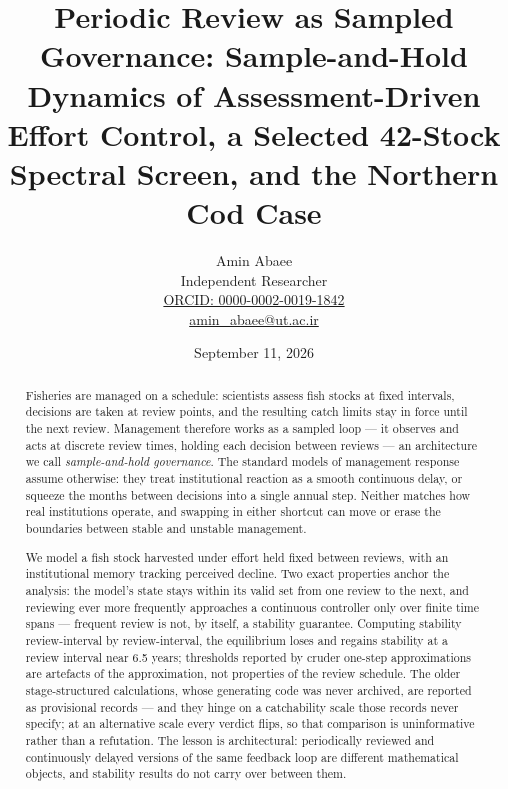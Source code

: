 \documentclass[11pt]{article}
\begin{document}
\linenumbers
\title{Periodic Review as Sampled Governance: Sample-and-Hold Dynamics of Assessment-Driven Effort Control, a Selected 42-Stock Spectral Screen, and the Northern Cod Case}
\author{Amin Abaee\\[0.35em]
{\small Independent Researcher}\\[0.55em]
{\small\href{https://orcid.org/0000-0002-0019-1842}{ORCID: 0000-0002-0019-1842}}\\[0.3em]
{\small\href{mailto:amin\_abaee@ut.ac.ir}{amin\_abaee@ut.ac.ir}}}
\date{September 11, 2026}
\maketitle

\begin{abstract}


Fisheries are managed on a schedule: scientists assess fish
stocks at fixed intervals, decisions are taken at review points, and
the resulting catch limits stay in force until the next review.
Management therefore works as a sampled loop --- it observes and acts
at discrete review times, holding each decision between reviews --- an
architecture we call \emph{sample-and-hold governance}. The standard
models of management response assume otherwise: they treat
institutional reaction as a smooth continuous delay, or squeeze
the months between decisions into a single annual step. Neither matches
how real institutions operate, and swapping in either shortcut can move
or erase the boundaries between stable and unstable management.

We model a fish stock harvested under effort held fixed between
reviews, with an institutional memory tracking perceived decline. Two
exact properties anchor the analysis: the model's state stays within
its valid set from one review to the next, and reviewing ever more
frequently approaches a continuous controller only over finite time
spans --- frequent review is not, by itself, a stability guarantee.
Computing stability review-interval by review-interval, the equilibrium
loses and regains stability at a review interval near 6.5 years;
thresholds reported by cruder one-step approximations are artefacts of
the approximation, not properties of the review schedule. The older
stage-structured calculations, whose generating code was never archived,
are reported as provisional records --- and they hinge on a catchability
scale those records never specify; at an alternative scale every
verdict flips, so that comparison is uninformative rather than a
refutation.
The lesson is architectural: periodically reviewed and continuously
delayed versions of the same feedback loop are different mathematical
objects, and stability results do not carry over between them.


\end{abstract}
\end{document}
